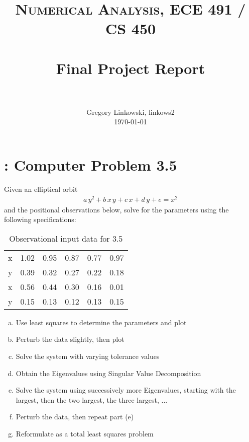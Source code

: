 \documentclass[paper=a4, fontsize=11pt]{scrartcl}
\title{
		\usefont{OT1}{bch}{b}{n}
		\normalfont \normalsize \textsc{Numerical Analysis, ECE 491 / CS 450} \\ [25pt]
		\horrule{0.5pt} \\[0.4cm]
		\huge Final Project Report \\
		\horrule{2pt} \\[0.5cm]
}
\author{
		\normalfont 								\normalsize
        Gregory Linkowski, linkows2\\[-3pt]		\normalsize
        \today
}
\date{}
\numberwithin{equation}{section}		%
\numberwithin{figure}{section}			%
\numberwithin{table}{section}				%
\begin{document}
\maketitle
\section{: Computer Problem 3.5}
Given an elliptical orbit
\begin{align}
	a \, y^2 + b \, x\, y + c\, x + d\, y + e = x^2
\end{align}
and the positional observations below, solve for the parameters using the following specifications:
\begin{table}[!hbt]
	\begin{center}
		\caption{Observational input data for 3.5}
		\label{tab:35input}
		\begin{tabular}{ c|c c c c c }
			x & 1.02 & 0.95 & 0.87 & 0.77 & 0.97 \\
			y & 0.39 & 0.32 & 0.27 & 0.22 & 0.18 \\
			\hline
			x & 0.56 & 0.44 & 0.30 & 0.16 & 0.01 \\
			y & 0.15 & 0.13 & 0.12 & 0.13 & 0.15 \\
		\end{tabular}
	\end{center}
\end{table}

\begin{enumerate}[(a)]
	\item Use least squares to determine the parameters and plot  \vspace{-2mm}
	\item Perturb the data slightly, then plot \vspace{-2mm}
	\item Solve the system with varying tolerance values \vspace{-2mm}
	\item Obtain the Eigenvalues using Singular Value Decomposition \vspace{-2mm}
	\item Solve the system using successively more Eigenvalues, starting with the largest, then the two largest, the three largest, ... \vspace{-2mm}
	\item Perturb the data, then repeat part (e) \vspace{-2mm}
	\item Reformulate as a total least squares problem \vspace{-2mm}
\end{enumerate}
\end{document}
